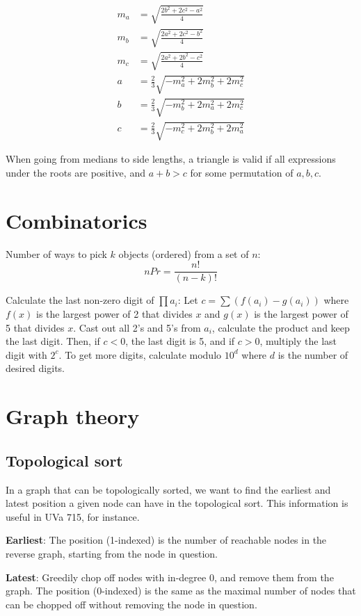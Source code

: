 \documentclass[a4paper,11pt]{article}
\begin{document}
\begin{align*}
	m_a &= \sqrt{\frac{2b^2+2c^2-a^2}{4}}\\
	m_b &= \sqrt{\frac{2a^2+2c^2-b^2}{4}}\\
	m_c &= \sqrt{\frac{2a^2+2b^2-c^2}{4}}\\
	a &= \frac{2}{3}\sqrt{-m_a^2 + 2m_b^2 + 2m_c^2} \\
	b &= \frac{2}{3}\sqrt{-m_b^2 + 2m_a^2 + 2m_c^2} \\
	c &= \frac{2}{3}\sqrt{-m_c^2 + 2m_b^2 + 2m_a^2}
\end{align*}

When going from medians to side lengths, a triangle is valid if all expressions under the roots are positive, and $a+b>c$ for some permutation of $a,b,c$.

\section{Combinatorics}

Number of ways to pick $k$ objects (ordered) from a set of $n$: $$n P r = \frac{n!}{(n-k)!}$$

Calculate the last non-zero digit of $\prod a_i$: Let $c=\sum (f(a_i)-g(a_i))$ where $f(x)$ is the largest power of 2 that divides $x$ and $g(x)$ is the largest power of 5 that divides $x$. Cast out all 2's and 5's from $a_i$, calculate the product and keep the last digit. Then, if $c<0$, the last digit is 5, and if $c>0$, multiply the last digit with $2^c$. To get more digits, calculate modulo $10^d$ where $d$ is the number of desired digits.

\section{Graph theory}

\subsection{Topological sort}

In a graph that can be topologically sorted, we want to find the earliest and latest position a given node can have in the topological sort. This information is useful in UVa 715, for instance.

{\bf Earliest}: The position (1-indexed) is the number of reachable nodes in the reverse graph, starting from the node in question.

{\bf Latest}: Greedily chop off nodes with in-degree 0, and remove them from the graph. The position (0-indexed) is the same as the maximal number of nodes that can be chopped off without removing the node in question.
\end{document}
